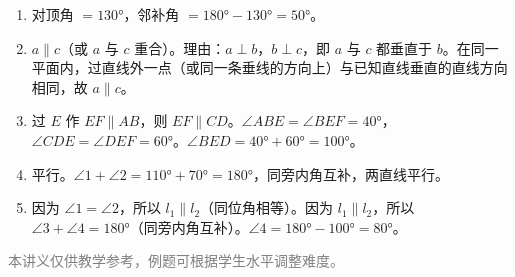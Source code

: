 \documentclass[12pt, a4paper]{ctexart}
\begin{document}
\vspace{10pt}
\begin{knowledgebox}[参考答案]
\begin{enumerate}[leftmargin=2em]
  \item 对顶角 $= 130°$，邻补角 $= 180° - 130° = 50°$。

  \item $a \parallel c$（或 $a$ 与 $c$ 重合）。理由：$a \perp b$，$b \perp c$，即 $a$ 与 $c$ 都垂直于 $b$。在同一平面内，过直线外一点（或同一条垂线的方向上）与已知直线垂直的直线方向相同，故 $a \parallel c$。

  \item 过 $E$ 作 $EF \parallel AB$，则 $EF \parallel CD$。$\angle ABE = \angle BEF = 40°$，$\angle CDE = \angle DEF = 60°$。$\angle BED = 40° + 60° = 100°$。

  \item 平行。$\angle 1 + \angle 2 = 110° + 70° = 180°$，同旁内角互补，两直线平行。

  \item 因为 $\angle 1 = \angle 2$，所以 $l_1 \parallel l_2$（同位角相等）。因为 $l_1 \parallel l_2$，所以 $\angle 3 + \angle 4 = 180°$（同旁内角互补）。$\angle 4 = 180° - 100° = 80°$。
\end{enumerate}
\end{knowledgebox}

\vfill
\begin{center}
\small\textcolor{gray}{本讲义仅供教学参考，例题可根据学生水平调整难度。}
\end{center}
\end{document}
